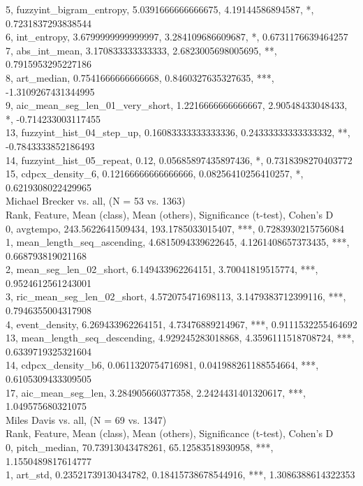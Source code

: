 5, fuzzyint_bigram_entropy, 5.0391666666666675, 4.19144586894587, *, 0.7231837293838544\\
6, int_entropy, 3.6799999999999997, 3.284109686609687, *, 0.6731176639464257\\
7, abs_int_mean, 3.170833333333333, 2.6823005698005695, **, 0.7915953295227186\\
8, art_median, 0.7541666666666668, 0.8460327635327635, ***, -1.3109267431344995\\
9, aic_mean_seg_len_01_very_short, 1.2216666666666667, 2.90548433048433, *, -0.714233003117455\\
13, fuzzyint_hist_04_step_up, 0.16083333333333336, 0.24333333333333332, **, -0.7843333852186493\\
14, fuzzyint_hist_05_repeat, 0.12, 0.05685897435897436, *, 0.7318398270403772\\
15, cdpcx_density_6, 0.12166666666666666, 0.08256410256410257, *, 0.6219308022429965\\
Michael Brecker vs. all, (N = 53 vs. 1363)\\
Rank, Feature, Mean (class), Mean (others), Significance (t-test), Cohen's D\\
0, avgtempo, 243.5622641509434, 193.1785033015407, ***, 0.7283930215756084\\
1, mean_length_seq_ascending, 4.6815094339622645, 4.1261408657373435, ***, 0.668793819021168\\
2, mean_seg_len_02_short, 6.149433962264151, 3.70041819515774, ***, 0.9524612561243001\\
3, ric_mean_seg_len_02_short, 4.572075471698113, 3.1479383712399116, ***, 0.7946355004317908\\
4, event_density, 6.269433962264151, 4.73476889214967, ***, 0.9111532255464692\\
13, mean_length_seq_descending, 4.929245283018868, 4.3596111518708724, ***, 0.6339719325321604\\
14, cdpcx_density_b6, 0.0611320754716981, 0.041988261188554664, ***, 0.6105309433309505\\
17, aic_mean_seg_len, 3.284905660377358, 2.2424431401320617, ***, 1.049575680321075\\
Miles Davis vs. all, (N = 69 vs. 1347)\\
Rank, Feature, Mean (class), Mean (others), Significance (t-test), Cohen's D\\
0, pitch_median, 70.73913043478261, 65.12583518930958, ***, 1.1550489817614777\\
1, art_std, 0.23521739130434782, 0.18415738678544916, ***, 1.3086388614322353\\
